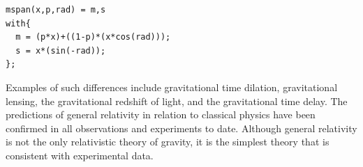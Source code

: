 \documentclass[
	a4paper,
	twocolumn
	]{article}
\begin{document}
\begin{lstlisting}
mspan(x,p,rad) = m,s
with{
  m = (p*x)+((1-p)*(x*cos(rad)));
  s = x*(sin(-rad));
};
\end{lstlisting}

Examples
of such differences include gravitational time dilation, gravitational lensing,
the gravitational redshift of light, and the gravitational time delay. The
predictions of general relativity in relation to classical physics have been
confirmed in all observations and experiments to date. Although general
relativity is not the only relativistic theory of gravity, it is the simplest
theory that is consistent with experimental data.

\vfill\null

\raggedright


\end{document}
